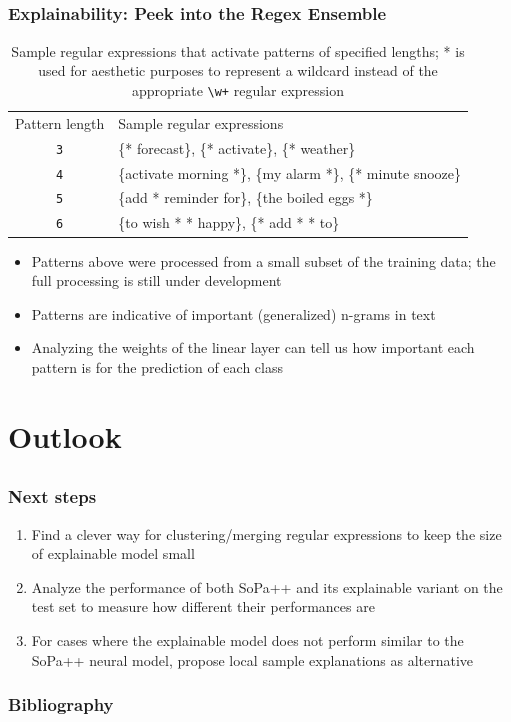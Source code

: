 \documentclass[10pt]{beamer}
\begin{document}
\subsection{}
\begin{frame}
  \frametitle{Explainability: Peek into the Regex Ensemble}
  \begin{table}[]
    \begin{tabular}{|c|l|}
      \cline{1-2}
      Pattern length & Sample regular expressions \\ \hhline{|=|=|}
      \texttt{3} & \{* forecast\}, \{* activate\}, \{* weather\} \\ \cline{1-2}
      \texttt{4} & \{activate morning *\}, \{my alarm *\}, \{* minute snooze\} \\ \cline{1-2}
      \texttt{5} & \{add * reminder for\}, \{the boiled eggs *\} \\ \cline{1-2}
      \texttt{6} & \{to wish * * happy\}, \{* add * * to\} \\ \cline{1-2}
    \end{tabular}
    \caption{Sample regular expressions that activate patterns of specified
      lengths; * is used for aesthetic purposes to represent a wildcard instead
      of the appropriate \texttt{\textbackslash{}w+} regular expression}
  \end{table}
  \begin{itemize}
    \item Patterns above were processed from a small subset of the training
    data; the full processing is still under development
    \item Patterns are indicative of important (generalized) n-grams in text
    \item Analyzing the weights of the linear layer can tell us how important
    each pattern is for the prediction of each class
  \end{itemize}
\end{frame}

\section{Outlook}
\subsection{}
\begin{frame}
  \frametitle{Next steps}
  \begin{enumerate}
    [square] \setlength\itemsep{0.8em}
    \item Find a clever way for clustering/merging regular expressions to keep
    the size of explainable model small
    \item Analyze the performance of both SoPa++ and its explainable variant on
    the test set to measure how different their performances are
    \item For cases where the explainable model does not perform similar to the
    SoPa++ neural model, propose local sample explanations as alternative
  \end{enumerate}
\end{frame}

\begin{frame}[allowframebreaks]
  \frametitle{Bibliography} \printbibliography[title = {Bibliography}]
\end{frame}
\end{document}
